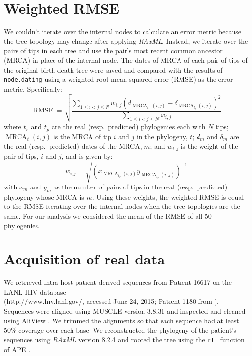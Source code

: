 \documentclass[12pt]{article}
\newcommand{\code}[1]{{\tt #1}}
\begin{document}
\section{Weighted RMSE} \label{sec:rmse}
We couldn't iterate over the internal nodes to calculate an error metric because the tree topology may change after applying \emph{RAxML}.
Instead, we iterate over the pairs of tips in each tree and use the pair's most recent common ancestor (MRCA) in place of the internal node.
The dates of MRCA of each pair of tips of the original birth-death tree were saved and compared with the results of \code{node.dating} using a weighted root mean squared error (RMSE) as the error metric.
Specifically:
\[\operatorname{RMSE} = \sqrt{\frac{\sum_{1 \leq i < j \leq N}w_{i,j}\left(d_{\operatorname{MRCA}_{t_r}(i,j)} - \delta_{\operatorname{MRCA}_{t_p}(i,j)}\right)^2}{\sum_{1 \leq i < j \leq N}w_{i,j}}}\]
where $t_r$ and $t_p$ are the real (resp.~predicted) phylogenies each with $N$ tips; $\operatorname{MRCA}_t(i, j)$ is the MRCA of tip $i$ and $j$ in the phylogeny, $t$; $d_{m}$ and $\delta_m$ are the real (resp.~predicted) dates of the MRCA, $m$; and $w_{i, j}$ is the weight of the pair of tips, $i$ and $j$, and is given by:
\[w_{i, j} = \sqrt{\left(x_{\operatorname{MRCA}_{t_r}(i,j)}y_{\operatorname{MRCA}_{t_p}(i,j)}\right)^{-1}}\]
with $x_m$ and $y_m$ as the number of pairs of tips in the real (resp.~predicted) phylogeny whose MRCA is $m$.
Using these weights, the weighted RMSE is equal to the RMSE iterating over the internal nodes when the tree topologies are the same.
For our analysis we considered the mean of the RMSE of all 50 phylogenies.

\section{Acquisition of real data}
We retrieved intra-host patient-derived sequences from Patient 16617 on the LANL HIV database \\ (http://www.hiv.lanl.gov/, accessed June 24, 2015; Patient 1180 from \cite{Llewellyn06}).
Sequences were aligned using MUSCLE version 3.8.31 \cite{Muscle04} and inspected and cleaned using AliView \citep{AliView14}. 
We trimmed the alignments so that each sequence had at least 50\% coverage over each base.
We reconstructed the phylogeny of the patient's sequences using \emph{RAxML} version 8.2.4 \citep{Raxml14} and rooted the tree using the \code{rtt} function of APE \citep{APE}.



\end{document}
